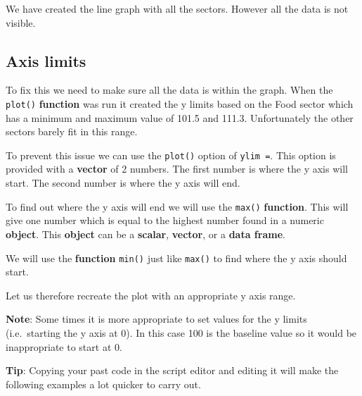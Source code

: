 \documentclass[]{book}
\begin{document}
We have created the line graph with all the sectors. However all the
data is not visible.

\subsection{Axis limits}\label{axis-limits}

To fix this we need to make sure all the data is within the graph. When
the \texttt{plot()} \textbf{function} was run it created the y limits
based on the Food sector which has a minimum and maximum value of 101.5
and 111.3. Unfortunately the other sectors barely fit in this range.

To prevent this issue we can use the \texttt{plot()} option of
\texttt{ylim\ =}. This option is provided with a \textbf{vector} of 2
numbers. The first number is where the y axis will start. The second
number is where the y axis will end.

To find out where the y axis will end we will use the \texttt{max()}
\textbf{function}. This will give one number which is equal to the
highest number found in a numeric \textbf{object}. This \textbf{object}
can be a \textbf{scalar}, \textbf{vector}, or a \textbf{data frame}.

We will use the \textbf{function} \texttt{min()} just like
\texttt{max()} to find where the y axis should start.

Let us therefore recreate the plot with an appropriate y axis range.

\textbf{Note}: Some times it is more appropriate to set values for the y
limits (i.e.~starting the y axis at 0). In this case 100 is the baseline
value so it would be inappropriate to start at 0.

\textbf{Tip}: Copying your past code in the script editor and editing it
will make the following examples a lot quicker to carry out.
\end{document}
